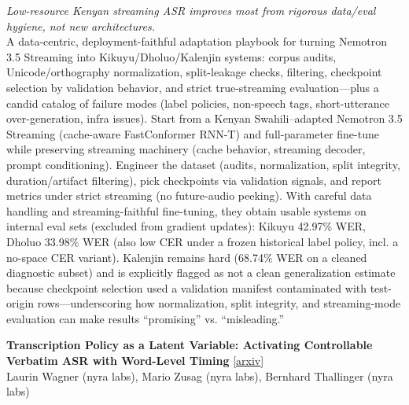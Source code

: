\documentclass[12pt,letterpaper]{article}
\begin{document}
{\small\textit{Low-resource Kenyan streaming ASR improves most from rigorous data/eval hygiene, not new architectures.}}\\[1pt]
{\footnotesize A data-centric, deployment-faithful adaptation playbook for turning Nemotron 3.5 Streaming into Kikuyu/Dholuo/Kalenjin systems: corpus audits, Unicode/orthography normalization, split-leakage checks, filtering, checkpoint selection by validation behavior, and strict true-streaming evaluation---plus a candid catalog of failure modes (label policies, non-speech tags, short-utterance over-generation, infra issues). Start from a Kenyan Swahili--adapted Nemotron 3.5 Streaming (cache-aware FastConformer RNN-T) and full-parameter fine-tune while preserving streaming machinery (cache behavior, streaming decoder, prompt conditioning). Engineer the dataset (audits, normalization, split integrity, duration/artifact filtering), pick checkpoints via validation signals, and report metrics under strict streaming (no future-audio peeking). With careful data handling and streaming-faithful fine-tuning, they obtain usable systems on internal eval sets (excluded from gradient updates): Kikuyu 42.97\% WER, Dholuo 33.98\% WER (also low CER under a frozen historical label policy, incl. a no-space CER variant). Kalenjin remains hard (68.74\% WER on a cleaned diagnostic subset) and is explicitly flagged as not a clean generalization estimate because checkpoint selection used a validation manifest contaminated with test-origin rows---underscoring how normalization, split integrity, and streaming-mode evaluation can make results ``promising'' vs. ``misleading.''}

\medskip

{\small\textbf{Transcription Policy as a Latent Variable: Activating Controllable Verbatim ASR with Word-Level Timing}} {\scriptsize[\href{https://arxiv.org/abs/2607.18934}{arxiv}]}\\
{\scriptsize Laurin Wagner (nyra labs), Mario Zusag (nyra labs), Bernhard Thallinger (nyra labs)}\\
\end{document}
